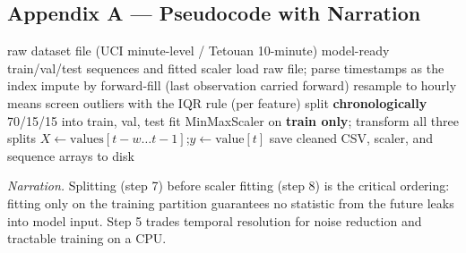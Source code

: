 \documentclass[11pt,a4paper]{article}
\begin{document}
\subsection{Appendix A --- Pseudocode with Narration}

\begin{algorithm}[H]
\caption*{\textbf{Algorithm A.1} --- End-to-end data pipeline (both datasets)}
\begin{algorithmic}[1]
\Require raw dataset file (UCI minute-level / Tetouan 10-minute)
\Ensure model-ready train/val/test sequences and fitted scaler
\State load raw file; parse timestamps as the index
 
  \State impute by forward-fill (last observation carried forward)
\EndIf
\State resample to hourly means 
\State screen outliers with the IQR rule (per feature)
\State split \textbf{chronologically} 70/15/15 into train, val, test
\State fit MinMaxScaler on \textbf{train only}; transform all three splits
 
  \State $X \gets \text{values}[t{-}w \dots t{-}1]$;\quad $y \gets \text{value}[t]$
\EndFor
\State save cleaned CSV, scaler, and sequence arrays to disk
\end{algorithmic}
\end{algorithm}
\noindent\textit{Narration.} Splitting (step 7) before scaler fitting (step 8)
is the critical ordering: fitting only on the training partition guarantees no
statistic from the future leaks into model input. Step 5 trades temporal resolution for noise reduction and tractable training on a CPU.
\end{document}
